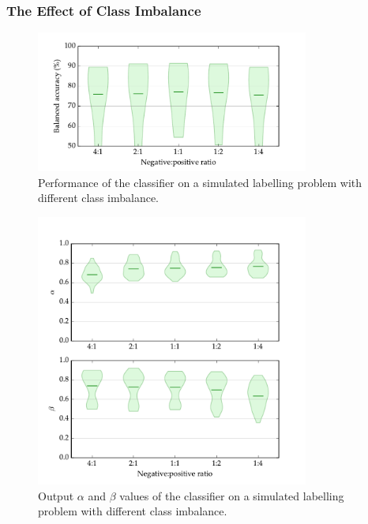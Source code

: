 
        \subsubsection{The Effect of Class Imbalance}

            \begin{figure}
                \centering
                \includegraphics[width=0.8\textwidth]
                    {images/experiments/raykar_class_balance_ba}
                \caption{Performance of the \citeauthor{raykar10} classifier on
                    a simulated labelling problem with different class
                    imbalance.}
                \label{fig:raykar-class-balance-ba}
            \end{figure}

            \begin{figure}
                \centering
                \includegraphics[width=0.8\textwidth]
                    {images/experiments/raykar_class_balance}
                \caption{Output $\alpha$ and $\beta$ values of the
                    \citeauthor{raykar10} classifier on a simulated labelling
                    problem with different class imbalance.}
                \label{fig:raykar-class-balance-ab}
            \end{figure}

